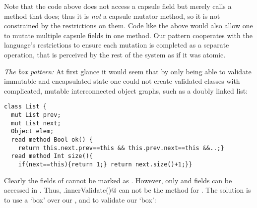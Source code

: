 
Note that the code above does not access a capsule field but merely calls a method that does; thus
it is \emph{not} a capsule mutator method, so it is not constrained by the restrictions on them. Code like the above would also allow one to mutate multiple capsule fields in one method.
Our pattern cooperates with the language’s restrictions to ensure each mutation is completed as a separate operation, that is perceived by the rest of the system
as if it was atomic.%


\loseSpace
\noindent\textit{The box pattern:}
At first glance it would seem that by only being able to validate immutable and encapsulated state one could not create validated classes with complicated, mutable interconnected object graphs, such as a doubly linked list:
\begin{lstlisting}[escapechar=\%]
class List {
  mut List prev;
  mut List next;
  Object elem;  
  read method Bool ok() {
    return this.next.prev==this && this.prev.next==this &&..;}
  read method Int size(){
    if(next==this){return 1;} return next.size()+1;}}
\end{lstlisting}
Clearly the \Q@mut@ fields of \Q@List@ cannot be marked as \Q@capsule@.
However, only \Q@capsule@ and \Q@imm@
fields can be accessed in \validate.
Thus, \Q@.innerValidate()@ can not be the \validate{} method for \Q@List@.
The solution is to use a `box' over our \Q@List@, and to validate our `box':

